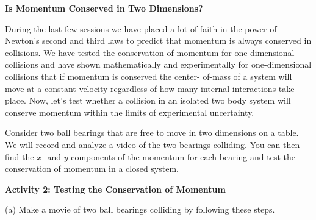 




\textbf{Is Momentum Conserved in Two Dimensions? }

During the last few sessions we have placed a lot of faith in the power of Newton's
second and third laws to predict that momentum is always conserved in collisions.
We have tested the conservation of momentum for one-dimensional collisions and
have shown mathematically and experimentally for one-dimensional collisions
that if momentum is conserved the center- of-mass of a system will move at a
constant velocity regardless of how many internal interactions take place. Now,
let's test whether a collision in an isolated two body system will conserve
momentum within the limits of experimental uncertainty. 

Consider two ball bearings that are free to move in two dimensions on a table.
We will record and analyze a video of the two bearings colliding. You can then
find the $x$- and $y$-components of the momentum for each bearing and test the 
conservation of momentum in a closed system. 

\textbf{Activity 2: Testing the Conservation of Momentum }

(a) Make a movie of two ball bearings colliding by following these steps. 

